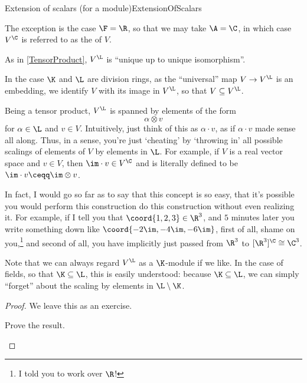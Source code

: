 \begin{thm}{Extension of scalars (for a module)}{ExtensionOfScalars}
\begin{rmk}
		The exception is the case $\F =\R$, so that we may take $\A =\C$, in which case $V^{\C}$ is referred to as the  of $V$.
	\end{rmk}
	\begin{rmk}
		As in \cref{TensorProduct}, $V^{\L}$ is ``unique up to unique isomorphism''.
	\end{rmk}
	\begin{rmk}
		In the case $\K$ and $\L$ are division rings, as the ``universal'' map $V\rightarrow V^{\L}$ is an embedding, we identify $V$ with its image in $V^{\L}$, so that $V\subseteq V^{\L}$.
	\end{rmk}
	\begin{rmk}
		Being a tensor product, $V^{\L}$ is spanned by elements of the form
		\begin{equation}
			\alpha \otimes v
		\end{equation}
		for $\alpha \in \L$ and $v\in V$.  Intuitively, just think of this as $\alpha \cdot v$, as if $\alpha \cdot v$ made sense all along.  Thus, in a sense, you're just `cheating' by `throwing in' all possible scalings of elements of $V$ by elements in $\L$.  For example, if $V$ is a real vector space and $v\in V$, then $\im \cdot v\in V^{\C}$ and is literally defined to be $\im \cdot v\ceqq \im \otimes v$.
		
		In fact, I would go so far as to say that this concept is so easy, that it's possible you would perform this construction do this construction without even realizing it.  For example, if I tell you that $\coord{1,2,3}\in \R ^3$, and $5$ minutes later you write something down like $\coord{-2\im ,-4\im ,-6\im}$, first of all, shame on you,\footnote{I told you to work over $\R$!} and second of all, you have implicitly just passed from $\R ^3$ to $[\R ^3]^{\C}\cong \C ^3$.
	\end{rmk}
	\begin{rmk}
		Note that we can always regard $V^{\L}$ as a $\K$-module if we like.  In the case of fields, so that $\K \subseteq \L$, this is easily understood:  because $\K \subseteq \L$, we can simply ``forget'' about the scaling by elements in $\L \setminus \K$.
	\end{rmk}
	\begin{proof}
		We leave this as an exercise.
		\begin{exr}[breakable=false]{}{}
			Prove the result.
		\end{exr}
	\end{proof}
\end{thm}
